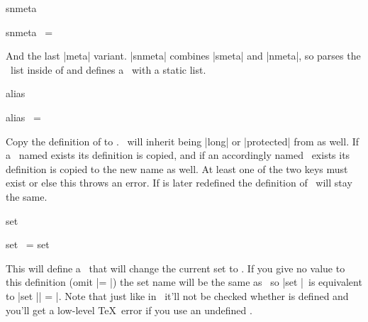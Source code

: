 \begin{function}[module=expkv-def type]{snmeta}
  \begin{syntax}
    snmeta \key\ = \kvarg {}
  \end{syntax}
  And the last |meta| variant. |snmeta| combines |smeta| and |nmeta|, so parses
  the \kv\ list inside of  and defines a \Nkey\ with a static list.
\end{function}

\begin{function}[module=expkv-def type]{alias}
  \begin{syntax}
    alias \key\ =  
  \end{syntax}
  Copy the definition of  to \key. \key\ will inherit being |long|
  or |protected| from  as well. If a \Vkey\ named 
  exists its definition is copied, and if an accordingly named \Nkey\ exists its
  definition is copied to the new name as well. At least one of the two keys
  must exist or else this throws an error. If  is later redefined
  the definition of \key\ will stay the same.
\end{function}

\begin{function}[module=expkv-def type]{set}
  \begin{syntax}
    set \key\ =  
    set \key
  \end{syntax}
  This will define a \Nkey\ that will change the current set to . If
  you give no value to this definition (omit |= |) the set name will
  be the same as \key\ so
  |set |\key\
  is equivalent to
  |set |\key| = |.
  Note that just like in \expkv\ it'll not be checked whether  is
  defined and you'll get a low-level \TeX\ error if you use an undefined
  \meta{set}.
\end{function}

